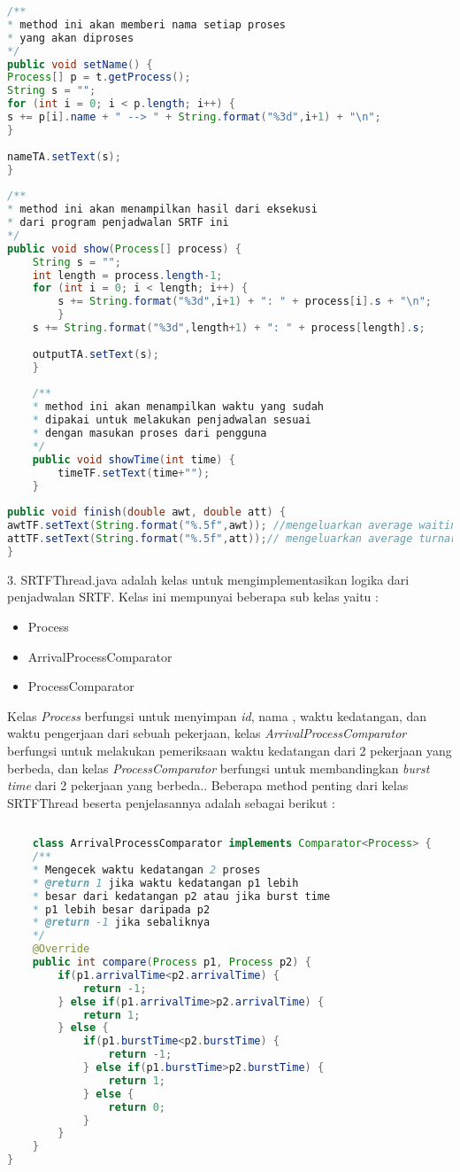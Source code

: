 \documentclass[a4paper,twoside]{article}
\begin{document}
\begin{enumerate}
\begin{lstlisting}[language=Java]
/**
* method ini akan memberi nama setiap proses
* yang akan diproses
*/
public void setName() {
Process[] p = t.getProcess();
String s = "";
for (int i = 0; i < p.length; i++) {
s += p[i].name + " --> " + String.format("%3d",i+1) + "\n";
}
        
nameTA.setText(s);
}
    
/**
* method ini akan menampilkan hasil dari eksekusi
* dari program penjadwalan SRTF ini
*/
public void show(Process[] process) {
    String s = "";
    int length = process.length-1;
    for (int i = 0; i < length; i++) {
        s += String.format("%3d",i+1) + ": " + process[i].s + "\n";
        }
    s += String.format("%3d",length+1) + ": " + process[length].s;
        
    outputTA.setText(s);
    }
    
    /**
    * method ini akan menampilkan waktu yang sudah
    * dipakai untuk melakukan penjadwalan sesuai 
    * dengan masukan proses dari pengguna
    */
    public void showTime(int time) {
        timeTF.setText(time+"");
    }
    
public void finish(double awt, double att) {
awtTF.setText(String.format("%.5f",awt)); //mengeluarkan average waiting time
attTF.setText(String.format("%.5f",att));// mengeluarkan average turnaroundtime
}
		\end{lstlisting}
		3. SRTFThread.java adalah kelas untuk mengimplementasikan logika dari penjadwalan SRTF. Kelas ini mempunyai beberapa sub kelas yaitu :{\it 
		\begin{itemize}
		\item Process
		\item ArrivalProcessComparator
		\item ProcessComparator
		\end{itemize}
		}
		Kelas {\it Process} berfungsi untuk menyimpan {\it id}, nama , waktu kedatangan, dan waktu pengerjaan dari sebuah pekerjaan, kelas {\it ArrivalProcessComparator} berfungsi untuk melakukan pemeriksaan waktu kedatangan dari 2 pekerjaan yang berbeda, dan kelas {\it ProcessComparator} berfungsi untuk membandingkan {\it burst time} dari 2 pekerjaan yang berbeda.. Beberapa method penting dari kelas SRTFThread beserta penjelasannya adalah sebagai berikut :\newline
		\begin{lstlisting}[language=Java]
		
	class ArrivalProcessComparator implements Comparator<Process> {
	/**
	* Mengecek waktu kedatangan 2 proses
	* @return 1 jika waktu kedatangan p1 lebih 
	* besar dari kedatangan p2 atau jika burst time 
	* p1 lebih besar daripada p2
	* @return -1 jika sebaliknya
	*/
	@Override
    public int compare(Process p1, Process p2) {
        if(p1.arrivalTime<p2.arrivalTime) {
            return -1; 
        } else if(p1.arrivalTime>p2.arrivalTime) {
            return 1;
        } else {
            if(p1.burstTime<p2.burstTime) {
                return -1;
            } else if(p1.burstTime>p2.burstTime) {
                return 1;
            } else {
                return 0;
            }
        }
    }
}


\end{lstlisting}
\end{enumerate}
\end{document}
